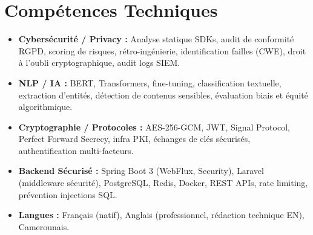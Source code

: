\documentclass[a4paper,11pt]{article}
\begin{document}
\section{Comp\'etences Techniques}
\begin{itemize}[leftmargin=*, nosep]
    \item \small{\textbf{Cybersécurité / Privacy :} Analyse statique SDKs, audit de conformité RGPD, scoring de risques, rétro-ingénierie, identification failles (CWE), droit à l'oubli cryptographique, audit logs SIEM.}
    \item \small{\textbf{NLP / IA :} BERT, Transformers, fine-tuning, classification textuelle, extraction d'entités, détection de contenus sensibles, évaluation biais et équité algorithmique.}
    \item \small{\textbf{Cryptographie / Protocoles :} AES-256-GCM, JWT, Signal Protocol, Perfect Forward Secrecy, infra PKI, échanges de clés sécurisés, authentification multi-facteurs.}
    \item \small{\textbf{Backend Sécurisé :} Spring Boot 3 (WebFlux, Security), Laravel (middleware sécurité), PostgreSQL, Redis, Docker, REST APIs, rate limiting, prévention injections SQL.}
    \item \small{\textbf{Langues :} Français (natif), Anglais (professionnel, rédaction technique EN), Camerounais.}
\end{itemize}
\end{document}
